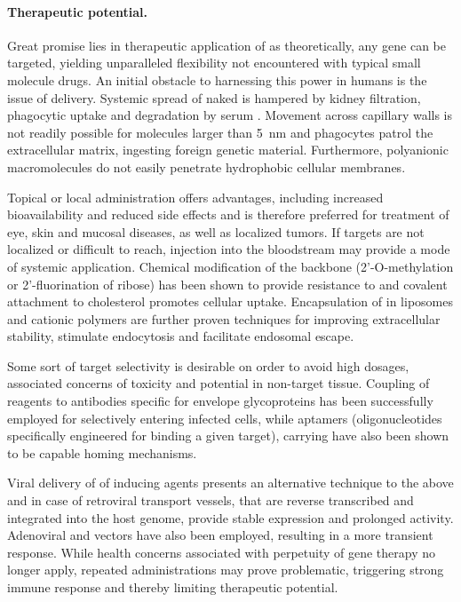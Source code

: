 \paragraph{Therapeutic potential.}
Great promise lies in therapeutic application of  as theoretically, any gene can be targeted, yielding unparalleled flexibility not encountered with typical small molecule drugs. An initial obstacle to harnessing this power in humans is the issue of delivery. Systemic spread of naked  is hampered by kidney filtration, phagocytic uptake and degradation by serum . Movement across capillary walls is not readily possible for molecules larger than \SI{5}{\nano\meter} and phagocytes patrol the extracellular matrix, ingesting foreign genetic material. Furthermore, polyanionic macromolecules do not easily penetrate hydrophobic cellular membranes.

Topical or local administration offers advantages, including increased bioavailability and reduced side effects and is therefore preferred for treatment of eye, skin and mucosal diseases, as well as localized tumors. If targets are not localized or difficult to reach, injection into the bloodstream may provide a mode of systemic application. Chemical modification of the  backbone (2'-O-methylation or 2'-fluorination of ribose) has been shown to provide resistance to  and covalent attachment to cholesterol promotes cellular uptake. Encapsulation of  in liposomes and cationic polymers are further proven techniques for improving extracellular stability, stimulate endocytosis and facilitate endosomal escape.

Some sort of target selectivity is desirable on order to avoid high dosages, associated concerns of toxicity and potential  in non-target tissue. Coupling of  reagents to antibodies specific for  envelope glycoproteins has been successfully employed for selectively entering infected cells, while aptamers (oligonucleotides specifically engineered for binding a given target), carrying  have also been shown to be capable homing mechanisms.

Viral delivery of of  inducing agents presents an alternative technique to the above and in case of retroviral transport vessels,  that are reverse transcribed and integrated into the host genome, provide stable expression and prolonged  activity. Adenoviral and  vectors have also been employed, resulting in a more transient response. While health concerns associated with perpetuity of gene therapy no longer apply, repeated administrations may prove problematic, triggering strong immune response and thereby limiting therapeutic potential.

